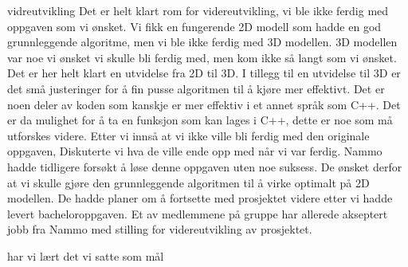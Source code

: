 vidreutvikling
Det er helt klart rom for videreutvikling, vi ble ikke ferdig med oppgaven som vi ønsket. Vi fikk en fungerende 2D modell som hadde en god grunnleggende algoritme, men vi ble ikke ferdig med 3D modellen. 3D modellen var noe vi ønsket vi skulle bli ferdig med, men kom ikke så langt som vi ønsket. Det er her helt klart en utvidelse fra 2D til 3D. I tillegg til en utvidelse til 3D er det små justeringer for å fin pusse algoritmen til å kjøre mer effektivt. Det er noen deler av koden som kanskje er mer effektiv i et annet språk som C++. Det er da mulighet for å ta en funksjon som kan lages i C++, dette er noe som må utforskes videre. 
Etter vi innså at vi ikke ville bli ferdig med den originale oppgaven, Diskuterte vi hva de ville ende opp med når vi var ferdig. Nammo hadde tidligere forsøkt å løse denne oppgaven uten noe suksess. De ønsket derfor at vi skulle gjøre den grunnleggende algoritmen til å virke optimalt på 2D modellen. De hadde planer om å fortsette med prosjektet videre etter vi hadde levert bacheloroppgaven. Et av medlemmene på gruppe har allerede akseptert jobb fra Nammo med stilling for videreutvikling av prosjektet. 

har vi lært det vi satte som mål


